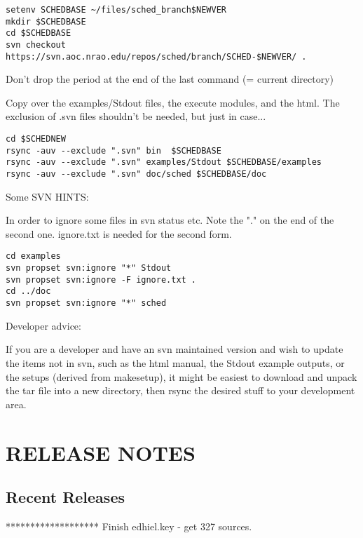 \documentclass{report}
\begin{document}
\begin{description}
\begin{verbatim}
setenv SCHEDBASE ~/files/sched_branch$NEWVER
mkdir $SCHEDBASE
cd $SCHEDBASE
svn checkout https://svn.aoc.nrao.edu/repos/sched/branch/SCHED-$NEWVER/ .
\end{verbatim}

Don't drop the period at the end of the last command (= current directory)

Copy over the examples/Stdout files, the execute modules, and the html.
The exclusion of .svn files shouldn't be needed, but just in case...

\begin{verbatim}
cd $SCHEDNEW
rsync -auv --exclude ".svn" bin  $SCHEDBASE
rsync -auv --exclude ".svn" examples/Stdout $SCHEDBASE/examples
rsync -auv --exclude ".svn" doc/sched $SCHEDBASE/doc
\end{verbatim}


Some SVN HINTS:

In order to ignore some files in svn status etc.
Note the "." on the end of the second one.  
ignore.txt is needed for the second form.

\begin{verbatim}
cd examples
svn propset svn:ignore "*" Stdout
svn propset svn:ignore -F ignore.txt .
cd ../doc
svn propset svn:ignore "*" sched
\end{verbatim}

Developer advice:

If you are a developer and have an svn maintained version and wish to
update the items not in svn, such as the html manual, the Stdout
example outputs, or the setups (derived from makesetup), it might be
easiest to download and unpack the tar file into a new directory,
then rsync the desired stuff to your development area.

\end{description}


\chapter{\label{CHP:CHANG}RELEASE NOTES}


\section{\label{SEC:CURRENT}Recent Releases}




*******************   Finish edhiel.key - get 327 sources.
\end{document}
